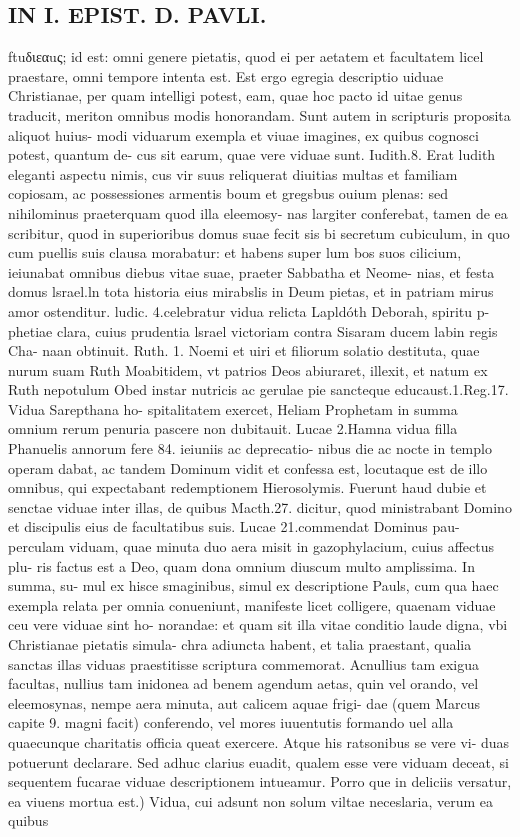 \documentclass{article}
\begin{document}
\begin{pages}
\section*{IN I. EPIST. D. PAVLI. }
\marginpar{[ p.106 ]}\pstart ftuδιεαuς; id est: omni genere pietatis, quod ei per aetatem et facultatem licel praestare, omni tempore intenta est. Est ergo egregia descriptio uiduae Christianae, per quam intelligi potest, eam, quae hoc pacto id uitae genus traducit, meriton omnibus modis honorandam. Sunt autem in scripturis proposita aliquot huius- modi viduarum exempla et viuae imagines, ex quibus cognosci potest, quantum de- cus sit earum, quae vere viduae sunt. Iudith.8. Erat ludith eleganti aspectu nimis, cus vir suus reliquerat diuitias multas et familiam copiosam, ac possessiones armentis boum et gregsbus ouium plenas: sed nihilominus praeterquam quod illa eleemosy- nas largiter conferebat, tamen de ea scribitur, quod in superioribus domus suae fecit sis bi secretum cubiculum, in quo cum puellis suis clausa morabatur: et habens super lum bos suos cilicium, ieiunabat omnibus diebus vitae suae, praeter Sabbatha et Neome- nias, et festa domus lsrael.ln tota historia eius mirabslis in Deum pietas, et in patriam mirus amor ostenditur. ludic. 4.celebratur vidua relicta Lapldóth Deborah, spiritu p- phetiae clara, cuius prudentia lsrael victoriam contra Sisaram ducem labin regis Cha- naan obtinuit. Ruth. 1. Noemi et uiri et filiorum solatio destituta, quae nurum suam Ruth Moabitidem, vt patrios Deos abiuraret, illexit, et natum ex Ruth nepotulum Obed instar nutricis ac gerulae pie sancteque educaust.1.Reg.17. Vidua Sarepthana ho- spitalitatem exercet, Heliam Prophetam in summa omnium rerum penuria pascere non dubitauit. Lucae 2.Hamna vidua filla Phanuelis annorum fere 84. ieiuniis ac deprecatio- nibus die ac nocte in templo operam dabat, ac tandem Dominum vidit et confessa est, locutaque est de illo omnibus, qui expectabant redemptionem Hierosolymis. Fuerunt haud dubie et senctae viduae inter illas, de quibus Macth.27. dicitur, quod ministrabant Domino et discipulis eius de facultatibus suis. Lucae 21.commendat Dominus pau- perculam viduam, quae minuta duo aera misit in gazophylacium, cuius affectus plu- ris factus est a Deo, quam dona omnium diuscum multo amplissima. In summa, su- mul ex hisce smaginibus, simul ex descriptione Pauls, cum qua haec exempla relata per omnia conueniunt, manifeste licet colligere, quaenam viduae ceu vere viduae sint ho- norandae: et quam sit illa vitae conditio laude digna, vbi Christianae pietatis simula- chra adiuncta habent, et talia praestant, qualia sanctas illas viduas praestitisse scriptura commemorat. Acnullius tam exigua facultas, nullius tam inidonea ad benem agendum aetas, quin vel orando, vel eleemosynas, nempe aera minuta, aut calicem aquae frigi- dae (quem Marcus capite 9. magni facit) conferendo, vel mores iuuentutis formando uel alla quaecunque charitatis officia queat exercere. Atque his ratsonibus se vere vi- duas potuerunt declarare. Sed adhuc clarius euadit, qualem esse vere viduam deceat, si sequentem fucarae viduae descriptionem intueamur.  \pend\pstart Porro que in deliciis versatur, ea viuens mortua est.) Vidua, cui adsunt non solum viltae neceslaria, verum ea quibus 
\end{pages}
\end{document}

